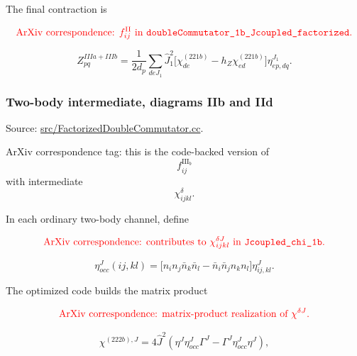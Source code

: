 \documentclass[
]{article}
\begin{document}
The final contraction is

\begin{equation}
{\color{red}\text{ArXiv correspondence: }f^{\mathrm{II}}_{ij}\text{ in }\texttt{doubleCommutator\_1b\_Jcoupled\_factorized}.}
\end{equation}

\begin{equation}
Z^{IIIa+IIIb}_{pq}
=\frac{1}{2d_p}\sum_{deJ_1}\hat J_1^2
\Big[\chi^{(221b)}_{de}-h_Z\chi^{(221b)}_{ed}\Big]
\eta^{J_1}_{ep,dq} .
\end{equation}

\subsubsection{Two-body intermediate, diagrams IIb and
IId}\label{two-body-intermediate-diagrams-iib-and-iid}

Source:
\href{../src/FactorizedDoubleCommutator.cc\#L380-L541}{src/FactorizedDoubleCommutator.cc}.

ArXiv correspondence tag: this is the code-backed version of \begin{equation}
f^{\mathrm{III}_b}_{ij}
\end{equation} with intermediate \begin{equation}
\chi^{\delta}_{ijkl}.
\end{equation}

In each ordinary two-body channel, define

\begin{equation}
{\color{red}\text{ArXiv correspondence: contributes to }\chi^{\delta J}_{ijkl}\text{ in }\texttt{Jcoupled\_chi\_1b}.}
\end{equation}

\begin{equation}
\eta^{J}_{occ}(ij,kl)
=\Big[n_i n_j\bar n_k\bar n_l-\bar n_i\bar n_j n_k n_l\Big]\eta^J_{ij,kl} .
\end{equation}

The optimized code builds the matrix product

\begin{equation}
{\color{red}\text{ArXiv correspondence: matrix-product realization of }\chi^{\delta J}.}
\end{equation}

\begin{equation}
\chi^{(222b),J}
=4\hat J^2\left(
\eta^J\eta^J_{occ}\Gamma^J
-\Gamma^J\eta^J_{occ}\eta^J
\right),
\end{equation}
\end{document}
